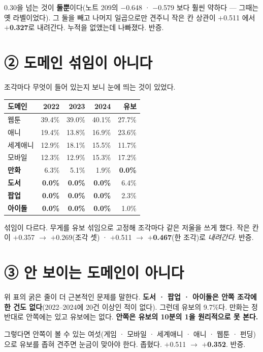 \documentclass[10pt]{article}
\begin{document}
0.30을 넘는 것이 \textbf{둘뿐}이다(노트 209의 $-$0.648 · $-$0.579 보다 훨씬
약하다 --- 그때는 옛 라벨이었다). 그 둘을 빼고 나머지 일곱으로만 견주니
작은 칸 상관이 $+$0.511 에서 \textbf{$+$0.327}로 내려간다. 누적을 없앴는데
나빠졌다. 반증.

\section{② 도메인 섞임이 아니다}

조각마다 무엇이 들어 있는지 보니 눈에 띄는 것이 있었다.

\begin{center}\small
\begin{tabular}{lrrrr}
\hline
도메인 & 2022 & 2023 & 2024 & 유보 \\
\hline
웹툰 & 39.4\% & 39.0\% & 40.1\% & 27.7\% \\
애니 & 19.4\% & 13.8\% & 16.9\% & 23.6\% \\
세계애니 & 12.9\% & 18.1\% & 15.5\% & 11.7\% \\
모바일 & 12.3\% & 12.9\% & 15.3\% & 17.2\% \\
\textbf{만화} & 6.3\% & 5.1\% & 1.9\% & \textbf{0.0\%} \\
\textbf{도서} & \textbf{0.0\%} & \textbf{0.0\%} & \textbf{0.0\%} & 6.4\% \\
\textbf{팝업} & \textbf{0.0\%} & \textbf{0.0\%} & \textbf{0.0\%} & 2.3\% \\
\textbf{아이돌} & \textbf{0.0\%} & \textbf{0.0\%} & \textbf{0.0\%} & 1.0\% \\
\hline
\end{tabular}
\end{center}

섞임이 다르다. 무게를 유보 섞임으로 고정해 조각마다 같은 저울을 쓰게 했다.
작은 칸이 $+$0.357 $\to$ $+$0.269(조각 셋) · $+$0.511 $\to$
\textbf{$+$0.467}(한 조각)로 \emph{내려간다}. 반증.

\section{③ 안 보이는 도메인이 아니다}

위 표의 굵은 줄이 더 근본적인 문제를 말한다. \textbf{도서 · 팝업 · 아이돌은
안쪽 조각에 한 건도 없다}(2022--2024에 20건 이상인 적이 없다). 그런데 유보의
9.7\%다. 만화는 정반대로 안쪽에는 있고 유보에는 없다. \textbf{안쪽은 유보의
10분의 1을 원리적으로 못 본다.}

그렇다면 안쪽이 볼 수 있는 여섯(게임 · 모바일 · 세계애니 · 애니 · 웹툰 ·
펀딩)으로 유보를 좁혀 견주면 눈금이 맞아야 한다. 좁혔다. $+$0.511 $\to$
\textbf{$+$0.352}. 반증.
\end{document}
